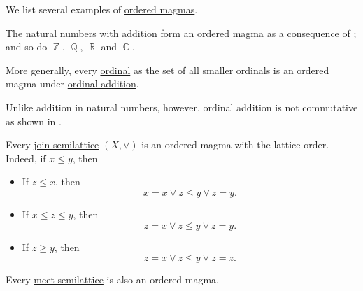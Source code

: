 \begin{example}\label{ex:def:ordered_magma}
  We list several examples of \hyperref[def:ordered_magma]{ordered magmas}.

  \begin{thmenum}
     The \hyperref[def:set_of_natural_numbers]{natural numbers} with addition form an ordered magma as a consequence of ; and so do \( \BbbZ \), \( \BbbQ \), \( \BbbR \) and \( \BbbC \).

     More generally, every \hyperref[def:ordinal]{ordinal} as the set of all smaller ordinals is an ordered magma under \hyperref[def:ordinal_arithmetic/addition]{ordinal addition}.

    Unlike addition in natural numbers, however, ordinal addition is not commutative as shown in .

     Every \hyperref[def:semilattice/join]{join-semilattice} \( (X, \vee) \) is an ordered magma with the lattice order. Indeed, if \( x \leq y \), then
    \begin{itemize}
      \item If \( z \leq x \), then
      \begin{equation*}
        x = x \vee z \leq y \vee z = y.
      \end{equation*}

      \item If \( x \leq z \leq y \), then
      \begin{equation*}
        z = x \vee z \leq y \vee z = y.
      \end{equation*}

      \item If \( z \geq y \), then
      \begin{equation*}
        z = x \vee z \leq y \vee z = z.
      \end{equation*}
    \end{itemize}

    Every \hyperref[def:semilattice/meet]{meet-semilattice} is also an ordered magma.
  \end{thmenum}
\end{example}

